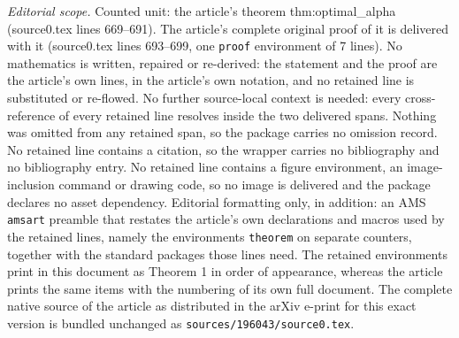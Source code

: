 \documentclass[10pt,a4paper]{amsart}
\begin{document}
\noindent\textit{Editorial scope.} Counted unit: the article's theorem thm:optimal\_alpha (source0.tex lines 669--691). The article's complete original proof of it is delivered with it (source0.tex lines 693--699, one \texttt{proof} environment of 7 lines). No mathematics is written, repaired or re-derived: the statement and the proof are the article's own lines, in the article's own notation, and no retained line is substituted or re-flowed.  No further source-local context is needed: every cross-reference of every retained line resolves inside the two delivered spans.  Nothing was omitted from any retained span, so the package carries no omission record.  No retained line contains a citation, so the wrapper carries no bibliography and no bibliography entry.  No retained line contains a figure environment, an image-inclusion command or drawing code, so no image is delivered and the package declares no asset dependency.  Editorial formatting only, in addition: an AMS \texttt{amsart} preamble that restates the article's own declarations and macros used by the retained lines, namely the environments \texttt{theorem} on separate counters, together with the standard packages those lines need.  The retained environments print in this document as Theorem 1 in order of appearance, whereas the article prints the same items with the numbering of its own full document.  The complete native source of the article as distributed in the arXiv e-print for this exact version is bundled unchanged as \texttt{sources/196043/source0.tex}.
\end{document}
